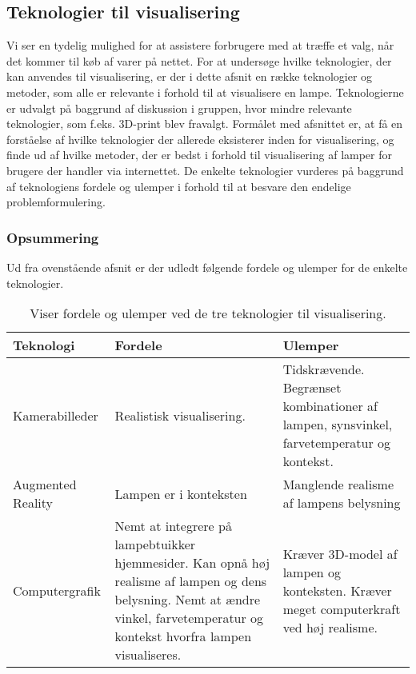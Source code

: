 \subsection{Teknologier til visualisering}
Vi ser en tydelig mulighed for at assistere forbrugere med at træffe et valg, når det kommer til køb af varer på nettet. For at undersøge hvilke teknologier, der kan anvendes til visualisering, er der i dette afsnit en række teknologier og metoder, som alle er relevante i forhold til at visualisere en lampe. Teknologierne er udvalgt på baggrund af diskussion i gruppen, hvor mindre relevante teknologier, som f.eks. 3D-print blev fravalgt. Formålet med afsnittet er, at få en forståelse af hvilke teknologier der allerede eksisterer inden for visualisering, og finde ud af hvilke metoder, der er bedst i forhold til visualisering af lamper for brugere der handler via internettet. De enkelte teknologier vurderes på baggrund af teknologiens fordele og ulemper i forhold til at besvare den endelige problemformulering.







\subsubsection*{Opsummering}
Ud fra ovenstående afsnit er der udledt følgende fordele og ulemper for de enkelte teknologier.
\begin{table}[H]
  \centering
  
\center
    \begin{tabular}{ | p{3cm} | p{5cm} | p{5cm} |}
    
    \hline
    Teknologi & Fordele & Ulemper \\ \hline
    Kamerabilleder & Realistisk visualisering. & Tidskrævende. Begrænset kombinationer af lampen, synsvinkel, farvetemperatur og kontekst. \\ \hline
    Augmented Reality & Lampen er i konteksten & Manglende realisme af lampens belysning \\ \hline
   Computergrafik & Nemt at integrere på lampebtuikker hjemmesider. Kan opnå høj realisme af lampen og dens belysning. \newline Nemt at ændre vinkel, farvetemperatur og kontekst hvorfra lampen visualiseres. & Kræver 3D-model af lampen og konteksten. Kræver meget computerkraft ved høj realisme. \\ \hline
    \end{tabular}
  \caption{Viser fordele og ulemper ved de tre teknologier til visualisering.}
\label{tab:fordele_ulemper_teknologier}
\end{table}

